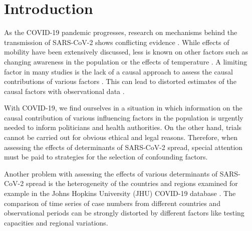 \documentclass[10pt,letterpaper]{article}
\begin{document}

\linenumbers

\section*{Introduction}\label{introduction}
As the COVID-19 pandemic progresses, research on mechanisms behind the transmission of SARS-CoV-2 shows conflicting evidence \cite{who2020report, Chinazzi395, guan2020clinical}. While effects of mobility have been extensively discussed, less is known on other factors such as changing awareness in the population
\cite{higgins_correlations_2020, li_retrospective_2020, yuan_trends_2020}
or the effects of temperature
\cite{bannister-tyrrell_preliminary_2020, demongeot_temperature_2020, liu_impact_2020}. A limiting factor in many studies is the lack of a causal approach to
assess the causal contributions of various factors
\cite{Greenland1999}. This can lead to distorted estimates of the
causal factors with observational data
\cite{Greenland1999, schipf_directed_2011, textor_robust_2017}.

With COVID-19, we find ourselves in a situation in which information on
the causal contribution of various influencing factors in the population
is urgently needed to inform politicians and health authorities. On the
other hand, trials cannot be carried out for obvious ethical and legal
reasons. Therefore, when assessing the effects of determinants of
SARS-CoV-2 spread, special attention must be paid to strategies for the
selection of confounding factors.

Another problem with assessing the effects of various determinants of
SARS-CoV-2 spread is the heterogeneity of the countries and regions
examined for example in the Johns Hopkins University (JHU) COVID-19
database \cite{jhucovid19db2020}. The comparison of time series of case
numbers from different countries and observational periods can be
strongly distorted by different factors like testing capacities and
regional variations.
\end{document}
